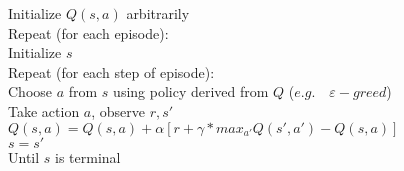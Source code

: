 \documentclass{article}
\begin{document}
\begin{flushleft}
Initialize $Q(s,a)$ arbitrarily\\
Repeat (for each episode):\\
\quad Initialize $s$\\
\quad Repeat (for each step of episode):\\
\quad \quad Choose $a$ from $s$ using policy derived from $Q$ ($e.g.\quad \varepsilon-greed$)\\
\quad \quad Take action $a$, observe $r, s'$\\
\quad \quad 	$Q(s,a) = Q(s,a) + \alpha[r + \gamma*max_{a'}Q(s', a') - Q(s,a)]$\\
\quad \quad $s = s'$\\
\quad \quad Until $s$ is terminal
\end{flushleft}
\end{document}
